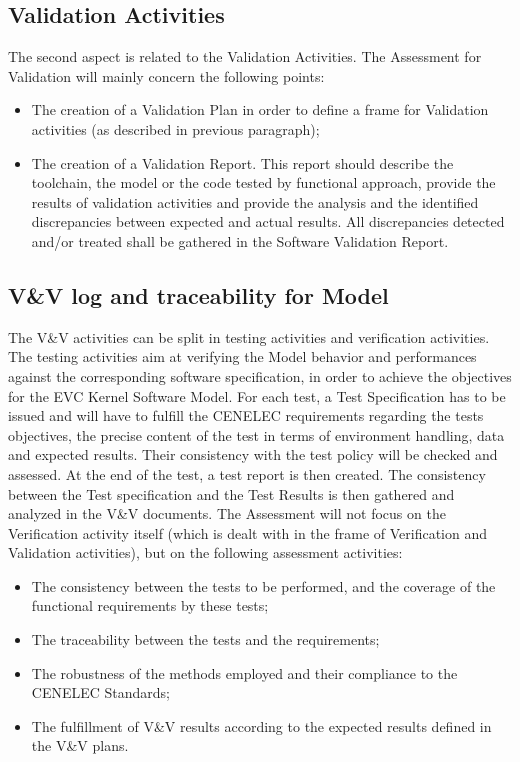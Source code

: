 \documentclass[openetcs]{template/openetcs_article}
\begin{document}
\subsection{Validation Activities}
The second aspect is related to the Validation Activities. The Assessment for Validation will mainly concern the following points:
\begin{itemize}
\item The creation of a Validation Plan in order to define a frame for Validation activities (as described in previous paragraph);
\item The creation of a Validation Report. This report should describe the toolchain, the model or the code tested by functional approach, provide the results
of validation activities and provide the analysis and the identified discrepancies between expected and actual results. All discrepancies detected and/or
treated shall be gathered in the Software Validation Report.
\end{itemize}

\subsection{V\&V log and traceability for Model}
The V\&V activities can be split in testing activities and verification activities. The testing activities aim at verifying the Model behavior and performances
against the corresponding software specification, in order to achieve the objectives for the EVC Kernel Software Model.
For each test, a Test Specification has to be issued and will have to fulfill the CENELEC requirements regarding the tests objectives, the precise content of
the test in terms of environment handling, data and expected results. Their consistency with the test policy will be checked and assessed. At the end of the
test, a test report is then created. The consistency between the Test specification and the Test Results is then gathered and analyzed in the V\&V documents.
The Assessment will not focus on the Verification activity itself (which is dealt with in the frame of Verification and Validation activities), but on
the following assessment activities:
\begin{itemize}
\item The consistency between the tests to be performed, and the coverage of the functional requirements by these tests;
\item The traceability between the tests and the requirements;
\item The robustness of the  methods employed and their compliance to the CENELEC Standards;
\item The fulfillment of V\&V results according to the expected results defined in the V\&V plans.
\end{itemize}
\end{document}
